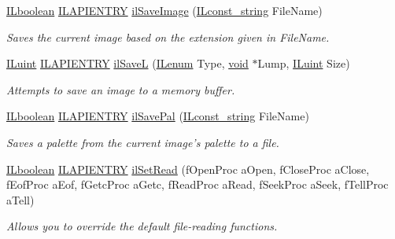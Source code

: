 \begin{DoxyCompactItemize}
\hyperlink{group__il__types_gaa6aa7c95cfdc06b4d8601ef832b7bb0a}{I\+Lboolean} \hyperlink{_i_l_8h_a69c08a8d06df986f7e46f209d131ef2f}{I\+L\+A\+P\+I\+E\+N\+T\+R\+Y} \hyperlink{group__file_ga0e9284b1c258d2e8ae123eb3e330723b}{il\+Save\+Image} (\hyperlink{group__il__types_ga1aa1edc3eb344e14acacb02bade24a5a}{I\+Lconst\+\_\+string} File\+Name)
\begin{DoxyCompactList}\small\item\em Saves the current image based on the extension given in File\+Name. \end{DoxyCompactList}\item 
\hyperlink{group__il__types_gaff8e86a1072c8d7cfe387fb87c6ed8e1}{I\+Luint} \hyperlink{_i_l_8h_a69c08a8d06df986f7e46f209d131ef2f}{I\+L\+A\+P\+I\+E\+N\+T\+R\+Y} \hyperlink{group__file_gab9b62589aceecd9c5e4b6ebfe326b181}{il\+Save\+L} (\hyperlink{group__il__types_ga62ca73445716183ef42b1f3906a45ed0}{I\+Lenum} Type, \hyperlink{_i_l_8h_a5530e04d947bcddd83639ea7940faf10}{void} $\ast$Lump, \hyperlink{group__il__types_gaff8e86a1072c8d7cfe387fb87c6ed8e1}{I\+Luint} Size)
\begin{DoxyCompactList}\small\item\em Attempts to save an image to a memory buffer. \end{DoxyCompactList}\item 
\hyperlink{group__il__types_gaa6aa7c95cfdc06b4d8601ef832b7bb0a}{I\+Lboolean} \hyperlink{_i_l_8h_a69c08a8d06df986f7e46f209d131ef2f}{I\+L\+A\+P\+I\+E\+N\+T\+R\+Y} \hyperlink{group__file_gafa4316e5d7b9a35bf872e7ddd2a8bb64}{il\+Save\+Pal} (\hyperlink{group__il__types_ga1aa1edc3eb344e14acacb02bade24a5a}{I\+Lconst\+\_\+string} File\+Name)
\begin{DoxyCompactList}\small\item\em Saves a palette from the current image's palette to a file. \end{DoxyCompactList}\item 
\hyperlink{group__il__types_gaa6aa7c95cfdc06b4d8601ef832b7bb0a}{I\+Lboolean} \hyperlink{_i_l_8h_a69c08a8d06df986f7e46f209d131ef2f}{I\+L\+A\+P\+I\+E\+N\+T\+R\+Y} \hyperlink{group__file_ga0da9f7a1b0cb90a147c1aad3f88f1278}{il\+Set\+Read} (f\+Open\+Proc a\+Open, f\+Close\+Proc a\+Close, f\+Eof\+Proc a\+Eof, f\+Getc\+Proc a\+Getc, f\+Read\+Proc a\+Read, f\+Seek\+Proc a\+Seek, f\+Tell\+Proc a\+Tell)
\begin{DoxyCompactList}\small\item\em Allows you to override the default file-\/reading functions. \end{DoxyCompactList}\item 

\end{DoxyCompactItemize}
